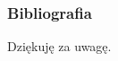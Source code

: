 \begin{frame}[t]
	\frametitle{Bibliografia}
	\nocite{*}
	
	
	
	\centering
	\vspace{5mm}
	Dziękuję za uwagę.
\end{frame}